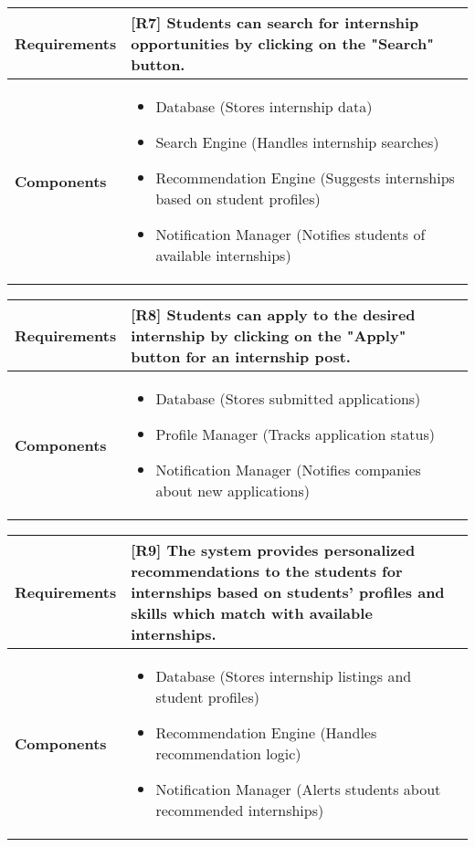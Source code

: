 \begin{table}[h!]
\centering
\begin{tabular}{|l|p{10cm}|}
\hline
\textbf{Requirements} & 
[R7] Students can search for internship opportunities by clicking on the "Search" button.\\
\hline
\textbf{Components} & 
\begin{itemize}
    \item Database (Stores internship data)
    \item Search Engine (Handles internship searches)
    \item Recommendation Engine (Suggests internships based on student profiles)
    \item Notification Manager (Notifies students of available internships)
\end{itemize} \\
\hline
\end{tabular}
\label{tab:req_comp}
\end{table}

\begin{table}[h!]
\centering
\begin{tabular}{|l|p{10cm}|}
\hline
\textbf{Requirements} & 
[R8] Students can apply to the desired internship by clicking on the "Apply" button for an internship post.\\
\hline
\textbf{Components} & 
\begin{itemize}
    \item Database (Stores submitted applications)
    \item Profile Manager (Tracks application status)
    \item Notification Manager (Notifies companies about new applications)
\end{itemize} \\
\hline
\end{tabular}
\label{tab:req_comp}
\end{table}

\begin{table}[h!]
\centering
\begin{tabular}{|l|p{10cm}|}
\hline
\textbf{Requirements} & 
[R9] The system provides personalized recommendations to the students for internships based on students' profiles and skills which match with available internships.\\
\hline
\textbf{Components} & 
\begin{itemize}
    \item Database (Stores internship listings and student profiles)
    \item Recommendation Engine (Handles recommendation logic)
    \item Notification Manager (Alerts students about recommended internships)
\end{itemize} \\
\hline
\end{tabular}
\label{tab:req_comp}
\end{table}

